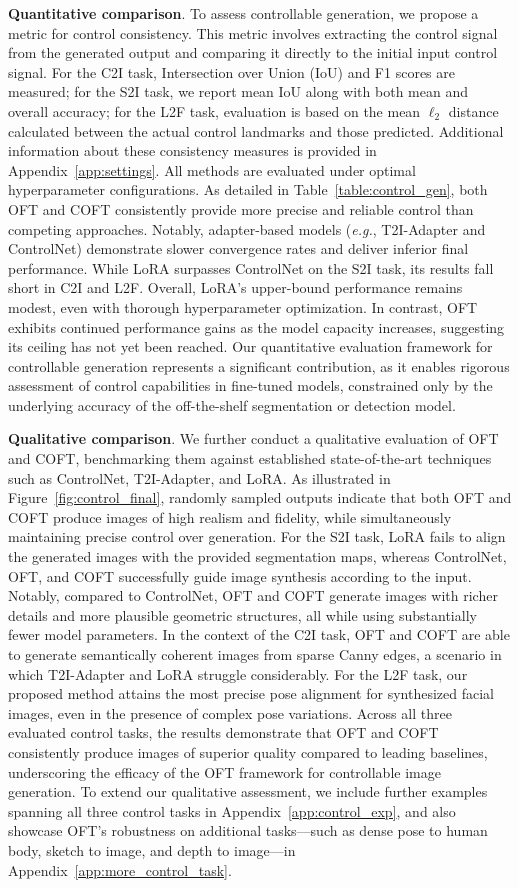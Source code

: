 \textbf{Quantitative comparison}. To assess controllable generation, we propose a metric for control consistency. This metric involves extracting the control signal from the generated output and comparing it directly to the initial input control signal. For the C2I task, Intersection over Union (IoU) and F1 scores are measured; for the S2I task, we report mean IoU along with both mean and overall accuracy; for the L2F task, evaluation is based on the mean $\ell_2$ distance calculated between the actual control landmarks and those predicted. Additional information about these consistency measures is provided in Appendix~\ref{app:settings}. All methods are evaluated under optimal hyperparameter configurations. As detailed in Table~\ref{table:control_gen}, both OFT and COFT consistently provide more precise and reliable control than competing approaches. Notably, adapter-based models (\emph{e.g.}, T2I-Adapter and ControlNet) demonstrate slower convergence rates and deliver inferior final performance. While LoRA surpasses ControlNet on the S2I task, its results fall short in C2I and L2F. Overall, LoRA’s upper-bound performance remains modest, even with thorough hyperparameter optimization. In contrast, OFT exhibits continued performance gains as the model capacity increases, suggesting its ceiling has not yet been reached. Our quantitative evaluation framework for controllable generation represents a significant contribution, as it enables rigorous assessment of control capabilities in fine-tuned models, constrained only by the underlying accuracy of the off-the-shelf segmentation or detection model.

\textbf{Qualitative comparison}. We further conduct a qualitative evaluation of OFT and COFT, benchmarking them against established state-of-the-art techniques such as ControlNet, T2I-Adapter, and LoRA. As illustrated in Figure~\ref{fig:control_final}, randomly sampled outputs indicate that both OFT and COFT produce images of high realism and fidelity, while simultaneously maintaining precise control over generation. For the S2I task, LoRA fails to align the generated images with the provided segmentation maps, whereas ControlNet, OFT, and COFT successfully guide image synthesis according to the input. Notably, compared to ControlNet, OFT and COFT generate images with richer details and more plausible geometric structures, all while using substantially fewer model parameters. In the context of the C2I task, OFT and COFT are able to generate semantically coherent images from sparse Canny edges, a scenario in which T2I-Adapter and LoRA struggle considerably. For the L2F task, our proposed method attains the most precise pose alignment for synthesized facial images, even in the presence of complex pose variations. Across all three evaluated control tasks, the results demonstrate that OFT and COFT consistently produce images of superior quality compared to leading baselines, underscoring the efficacy of the OFT framework for controllable image generation. To extend our qualitative assessment, we include further examples spanning all three control tasks in Appendix~\ref{app:control_exp}, and also showcase OFT's robustness on additional tasks—such as dense pose to human body, sketch to image, and depth to image—in Appendix~\ref{app:more_control_task}.

